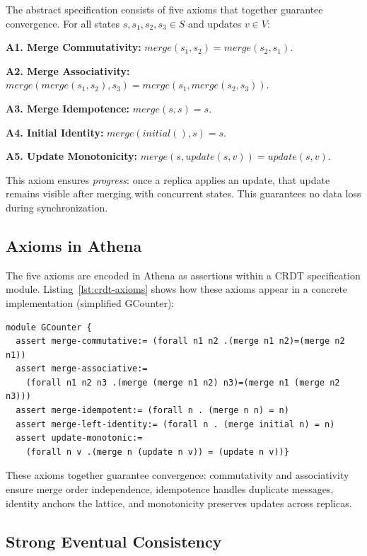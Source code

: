 The abstract specification consists of five axioms that together guarantee convergence. For all states $s, s_1, s_2, s_3 \in S$ and updates $v \in V$:

\textbf{A1. Merge Commutativity:} $\mathit{merge}(s_1, s_2) = \mathit{merge}(s_2, s_1)$.

\textbf{A2. Merge Associativity:} $\mathit{merge}(\mathit{merge}(s_1, s_2), s_3) = \mathit{merge}(s_1, \mathit{merge}(s_2, s_3))$.

\textbf{A3. Merge Idempotence:} $\mathit{merge}(s, s) = s$.

\textbf{A4. Initial Identity:} $\mathit{merge}(\mathit{initial}(), s) = s$.

\textbf{A5. Update Monotonicity:} $\mathit{merge}(s, \mathit{update}(s, v)) = \mathit{update}(s, v)$.

This axiom ensures \emph{progress}: once a replica applies an update, that update remains visible after merging with concurrent states. This guarantees no data loss during synchronization.

\subsection*{Axioms in Athena}

The five axioms are encoded in Athena as assertions within a CRDT specification module. Listing~\ref{lst:crdt-axioms} shows how these axioms appear in a concrete implementation (simplified GCounter):

\begin{lstlisting}[language=Athena,style=athena,label={lst:crdt-axioms},caption={The five CRDT axioms encoded in Athena}]
module GCounter {
  assert merge-commutative:= (forall n1 n2 .(merge n1 n2)=(merge n2 n1))
  assert merge-associative:=
    (forall n1 n2 n3 .(merge (merge n1 n2) n3)=(merge n1 (merge n2 n3)))
  assert merge-idempotent:= (forall n . (merge n n) = n)
  assert merge-left-identity:= (forall n . (merge initial n) = n)
  assert update-monotonic:=
    (forall n v .(merge n (update n v)) = (update n v))}
\end{lstlisting}

These axioms together guarantee convergence: commutativity and associativity ensure merge order independence, idempotence handles duplicate messages, identity anchors the lattice, and monotonicity preserves updates across replicas.

\subsection*{Strong Eventual Consistency}

